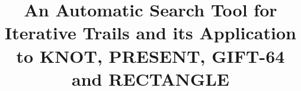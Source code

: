 \documentclass[runningheads]{llncs}
\begin{document}
%
\title{An Automatic Search Tool for Iterative Trails and its Application to KNOT, PRESENT, GIFT-64 and RECTANGLE 
}
%
%
%
%
%
\maketitle              %
%
\begin{abstract}

\end{abstract}





%
%



\end{document}
